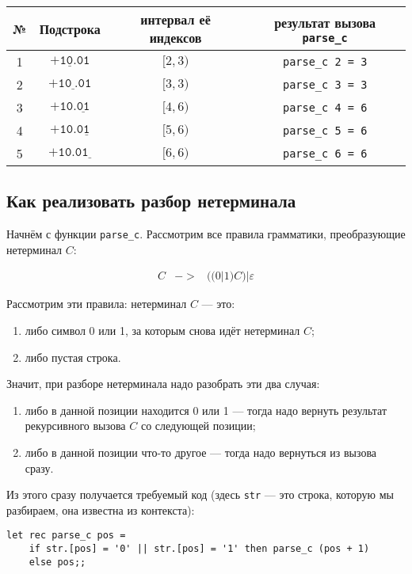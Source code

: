 \documentclass[12pt]{article}
\begin{document}
\begin{tabular}{cccc}
№ &Подстрока & интервал её индексов & результат вызова \verb!parse_c!\\
\hline
1 & $\texttt{+1}\underline{\texttt{0}}\texttt{.01}$ & $[2,3)$ & \verb!parse_c 2 = 3! \\
2 & $\texttt{+10}\underline{\texttt{}}\texttt{.01}$ & $[3,3)$ & \verb!parse_c 3 = 3! \\
3 & $\texttt{+10.}\underline{\texttt{01}}\texttt{}$ & $[4,6)$ & \verb!parse_c 4 = 6! \\
4 & $\texttt{+10.0}\underline{\texttt{1}}\texttt{}$ & $[5,6)$ & \verb!parse_c 5 = 6! \\
5 & $\texttt{+10.01}\underline{\texttt{}}\texttt{}$ & $[6,6)$ & \verb!parse_c 6 = 6!
\end{tabular}

\subsection{Как реализовать разбор нетерминала}

Начнём с функции \verb!parse_c!. Рассмотрим все правила грамматики, преобразующие
нетерминал $C$:

\begin{bnf}\begin{eqnarray*}
C &->& ((0 | 1) C) | \varepsilon
\end{eqnarray*}\end{bnf}

Рассмотрим эти правила: нетерминал $C$ --- это:
\begin{enumerate}
\item либо символ 0 или 1, за которым снова идёт нетерминал $C$;
\item либо пустая строка.
\end{enumerate}
Значит, при разборе нетерминала надо разобрать эти два случая:
\begin{enumerate}
\item либо в данной позиции находится 0 или 1 --- тогда надо вернуть результат 
рекурсивного вызова $C$ со следующей позиции;
\item либо в данной позиции что-то другое --- тогда надо вернуться из вызова сразу.
\end{enumerate}

Из этого сразу получается требуемый код (здесь \verb!str! --- это строка,
которую мы разбираем, она известна из контекста):

\begin{verbatim}
let rec parse_c pos =
    if str.[pos] = '0' || str.[pos] = '1' then parse_c (pos + 1)
    else pos;;
\end{verbatim}
\end{document}
